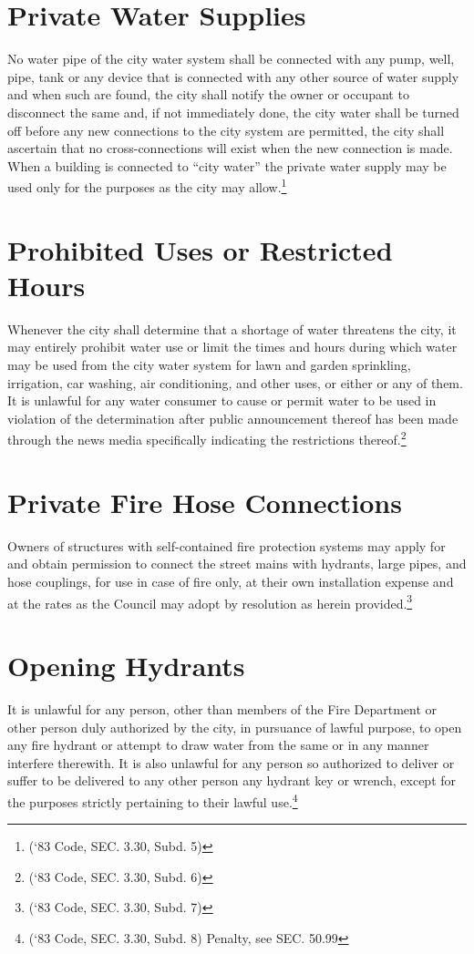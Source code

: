 \section{Private Water Supplies}
No water pipe of the city water system shall be connected with any pump, well, pipe, tank or any device that is connected with any other source of water supply and when such are found, the city shall notify the owner or occupant to disconnect the same and, if not immediately done, the city water shall be turned off before any new connections to the city system are permitted, the city shall ascertain that no cross-connections will exist when the new connection is made. When a building is connected to “city water” the private water supply may be used only for the purposes as the city may allow.\footnote{(‘83 Code, SEC. 3.30, Subd. 5)}

\section{Prohibited Uses or Restricted Hours}
Whenever the city shall determine that a shortage of water threatens the city, it may entirely prohibit water use or limit the times and hours during which water may be used from the city water system for lawn and garden sprinkling, irrigation, car washing, air conditioning, and other uses, or either or any of them.  It is unlawful for any water consumer to cause or permit water to be used in violation of the determination after public announcement thereof has been made through the news media specifically indicating the restrictions thereof.\footnote{(‘83 Code, SEC. 3.30, Subd. 6)}

\section{Private Fire Hose Connections}
Owners of structures with self-contained fire protection systems may apply for and obtain permission to connect the street mains with hydrants, large pipes, and hose couplings, for use in case of fire only, at their own installation expense and at the rates as the Council may adopt by resolution as herein provided.\footnote{(‘83 Code, SEC. 3.30, Subd. 7)}

\section{Opening Hydrants}
It is unlawful for any person, other than members of the Fire Department or other person duly authorized by the city, in pursuance of lawful purpose, to open any fire hydrant or attempt to draw water from the same or in any manner interfere therewith.  It is also unlawful for any person so authorized to deliver or suffer to be delivered to any other person any hydrant key or wrench, except for the purposes strictly pertaining to their lawful use.\footnote{(‘83 Code, SEC. 3.30, Subd. 8)  Penalty, see SEC. 50.99}

